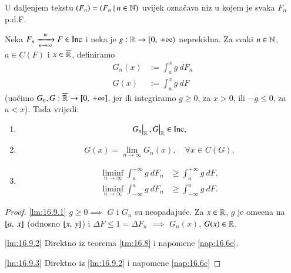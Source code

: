 U daljenjem tekstu $(F_n) = ({F_n} \: | \: {n \in \mathbb{N}})$ uvijek ozna\v cava niz u kojem je svaka $F_n$ p.d.F.

\begin{lm}  \label{lm:16.9}
    Neka $F_n \xrightarrow[n \to \infty]{w} F \in \mathrm{Inc}$ i neka je $g: \mathbb{R} \to [ {0}, \: {+\infty} \rangle$ neprekidna.
    Za svaki $n \in \mathbb{N}$, $a \in C(F)$ i $x \in \overline{\mathbb{R}}$, definiramo
    \begin{equation*}
        \begin{aligned}
            G_n (x) &:= \int_a^x g \: d F_n\\
            G(x) &:= \int_a^x g \: d F
        \end{aligned}
    \end{equation*}
    (uo\v cimo $G_n, G : \overline{\mathbb{R}} \to [{0}, \:{+\infty}]$, jer ili integriramo $g \geq 0$, za $x > 0$, ili $-g \leq 0$, za $a < x$).
    Tada vrijedi:
    \begin{enumerate}[label=(\roman*)]
        \item \label{lm:16.9.1}
        \begin{equation*}
            \restr{G_n}{\real}, \restr{G}{\real} \in \inc,
        \end{equation*}
        \item \label{lm:16.9.2}
        \begin{equation*}
            G (x) = \lim_{n \to \infty} G_n(x), \quad \forall x \in C(G),
        \end{equation*}
        \item \label{lm:16.9.3}
        \begin{equation*}
            \begin{aligned}
                \liminf\limits_{n \to \infty} \int_a^{+\infty} g \: d F_n &\geq \int_a^{+\infty} g \: d F,\\
                \liminf\limits_{n \to \infty} \int_{-\infty}^a g \: d F_n &\geq \int_{-\infty}^a g \: d F.
            \end{aligned}
        \end{equation*}
    \end{enumerate}
\end{lm}

\begin{proof}
    \ref{lm:16.9.1} $g \geq 0 \implies$ $G$ i $G_n$ su neopadaju\' ce.
    Za $x \in \mathbb{R}$, $g$ je ome\dj ena na $[{a}, \:{x}]$ (odnosno $[{x}, \:{y}]$) i $\Delta F \leq 1 = \Delta F_n$ $\implies$ $G_n (x)$, $G(x) \in \mathbb{R}$.

    \ref{lm:16.9.2} Direktno iz teorema \ref{tm:16.8} i napomene \ref{nap:16.6e}.

    \ref{lm:16.9.3} Direktno iz \ref{lm:16.9.2} i napomene \ref{nap:16.6c}
\end{proof}

